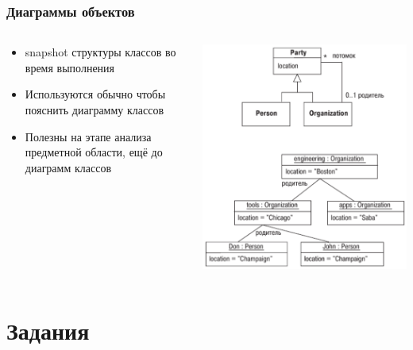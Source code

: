 \documentclass[xetex,mathserif,serif]{beamer}
\begin{document}
	\begin{frame}
		\frametitle{Диаграммы объектов}
				\begin{columns}
			\begin{column}{0.5\textwidth}
				\begin{itemize}
					\item snapshot структуры классов во время выполнения
					\item Используются обычно чтобы пояснить диаграмму классов
					\item Полезны на этапе анализа предметной области, ещё до диаграмм классов
				\end{itemize}
			\end{column}
			\begin{column}{0.5\textwidth}
				\begin{center}
					\includegraphics[width=\textwidth]{objectsDiagram.png}
				\end{center}
			\end{column}
		\end{columns}
	\end{frame}

	\section{Задания}
\end{document}
